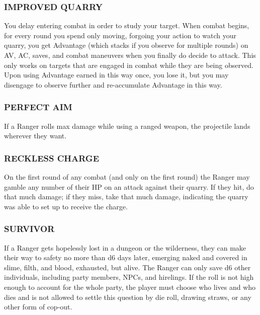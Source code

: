 \documentclass[twoside]{article}
\begin{document}
\subsubsection*{\footnotesize{I}\scriptsize{MPROVED} \footnotesize{Q}\scriptsize{UARRY}\normalsize}

You delay entering combat in order to study your target. When combat begins, for every round you spend only moving, forgoing your action to watch your quarry, you get Advantage (which stacks if you observe for multiple rounds) on AV, AC, saves, and combat maneuvers when you finally do decide to attack. This only works on targets that are engaged in combat while they are being observed. Upon using Advantage earned in this way once, you lose it, but you may disengage to observe further and re-accumulate Advantage in this way.

\subsubsection*{\footnotesize{P}\scriptsize{ERFECT} \footnotesize{A}\scriptsize{IM}\normalsize}

If a Ranger rolls max damage while using a ranged weapon, the projectile lands wherever they want.

\subsubsection*{\footnotesize{R}\scriptsize{ECKLESS} \footnotesize{C}\scriptsize{HARGE}\normalsize}

On the first round of any combat (and only on the first round) the Ranger may gamble any number of their HP on an attack against their quarry. If they hit, do that much damage; if they miss, take that much damage, indicating the quarry was able to set up to receive the charge.

\subsubsection*{\footnotesize{S}\scriptsize{URVIVOR}\normalsize}

If a Ranger gets hopelessly lost in a dungeon or the wilderness, they can make their way to safety no more than d6 days later, emerging naked and covered in slime, filth, and blood, exhausted, but alive. The Ranger can only save d6 other individuals, including party members, NPCs, and hirelings. If the roll is not high enough to account for the whole party, the player must choose who lives and who dies and is not allowed to settle this question by die roll, drawing straws, or any other form of cop-out.
\end{document}
